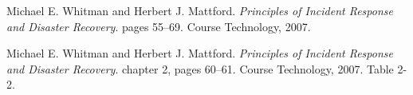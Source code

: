 \documentclass[english]{gucreport}
\begin{document}
	\makefrontpages
	\tableofcontents
	\showindex		%
	
	
	

	
	
	\begin{thebibliography}{99}
			Michael E. Whitman and Herbert J. Mattford.
			\emph{Principles of Incident Response and Disaster Recovery}.
			pages 55–69.
			Course Technology, 2007.
			
			Michael E. Whitman and Herbert J. Mattford.
			\emph{Principles of Incident Response and Disaster Recovery}.
			chapter 2, 	pages 60–61.
			Course Technology, 2007.
			Table 2-2.
	\end{thebibliography}

	\appendix %
\end{document}
